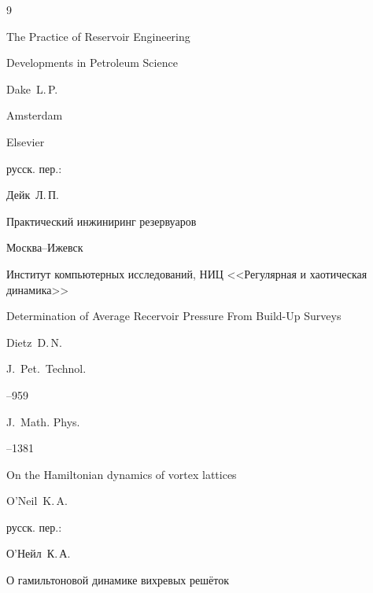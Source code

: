\begin{thebibliography}{9}




\book The Practice of Reservoir Engineering 


\serial Developments in Petroleum Science

\by  Dake~L.\,P.

\publaddr Amsterdam

\publ Elsevier



\rtransl русск. пер.:~

\by Дейк~Л.\,П.

\book Практический инжиниринг резервуаров

\publaddr Москва--Ижевск

\publ Институт компьютерных исследований, НИЦ <<Регулярная и хаотическая динамика>>






\paper Determination of Average Recervoir Pressure From Build-Up Surveys

\by Dietz~D.\,N.

\jour J.~Pet.~Technol.




--959






\jour J.~Math. Phys. 

--1381 



\paper On the Hamiltonian dynamics of vortex lattices

\by O'Neil~K.\,A. 

\rtransl русск. пер.:~

\by  О'Нейл~К.\,А.

\paper О гамильтоновой динамике вихревых решёток


\end{thebibliography}

